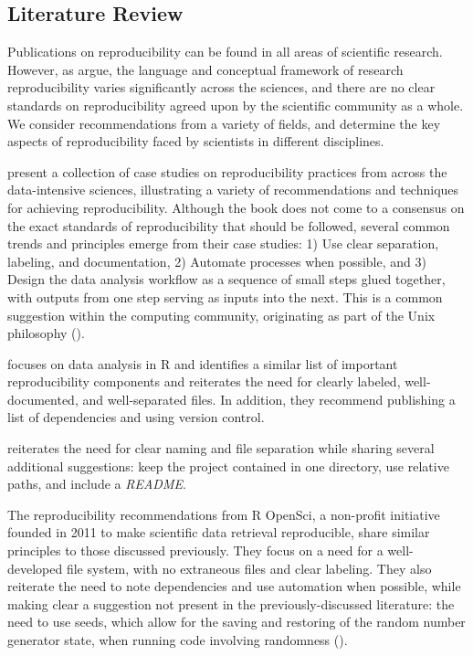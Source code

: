 \documentclass[APA,LATO1COL]{WileyNJD-v2}\usepackage[]{graphicx}\usepackage[]{color}
\newcommand{\R}{\textsf{R}\xspace}
\newcommand{\cmd}[1]{\textit{#1}}
\begin{document}
\subsection{Literature Review}\label{sec:papers}

Publications on reproducibility can be found in all areas of scientific research. However, as \cite{Goodman341ps12} argue, the language and conceptual framework of research reproducibility varies significantly across the sciences, and there are no clear standards on reproducibility agreed upon by the scientific community as a whole. We consider recommendations from a variety of fields, and determine the key aspects of reproducibility faced by scientists in different disciplines. 

\cite{kitzes2017practice} present a collection of case studies on reproducibility practices from across the data-intensive sciences, illustrating a variety of recommendations and techniques for achieving reproducibility. Although the book does not come to a consensus on the exact standards of reproducibility that should be followed, several common trends and principles emerge from their case studies: 1) Use clear separation, labeling, and documentation, 2) Automate processes when possible, and 3) Design the data analysis workflow as a sequence of small steps glued together, with outputs from one step serving as inputs into the next. This is a common suggestion within the computing community, originating as part of the Unix philosophy (\cite{unix}).

\cite{cooper2017guide} focuses on data analysis in \R and identifies a similar list of important reproducibility components and reiterates the need for clearly labeled, well-documented, and well-separated files. In addition, they recommend publishing a list of dependencies and using version control. 

\cite{broman} reiterates the need for clear naming and file separation while sharing several additional suggestions: keep the project contained in one directory, use relative paths, and include a \cmd{README}.

The reproducibility recommendations from R OpenSci, a non-profit initiative founded in 2011 to make scientific data retrieval reproducible, share similar principles to those discussed previously. They focus on a need for a well-developed file system, with no extraneous files and clear labeling. They also reiterate the need to note dependencies and use automation when possible, while making clear a suggestion not present in the previously-discussed literature: the need to use seeds, which allow for the saving and restoring of the random number generator state, when running code involving randomness (\cite{r-opensci}).
\end{document}
